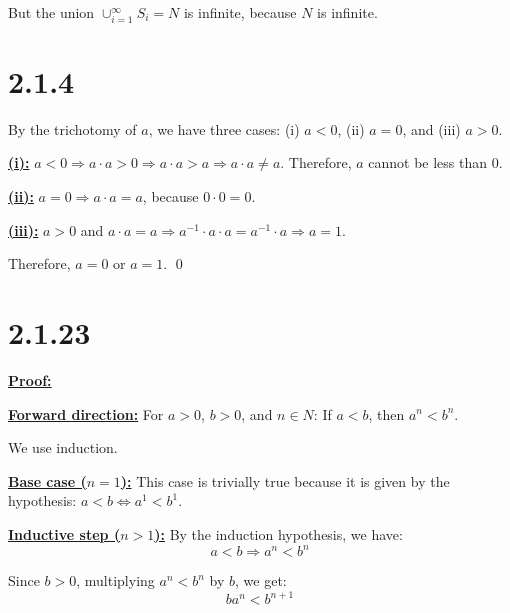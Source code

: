 \documentclass{article}
\begin{document}
\noindent
But the union $\cup_{i=1}^{\infty}S_i = N$ is infinite, because $N$ is infinite.
\newline

\section*{2.1.4}
By the trichotomy of $a$, we have three cases: (i) $a < 0$, (ii) $a = 0$, and (iii) $a > 0$.
\newline

\noindent
\textbf{\underline{(i):}} $a<0 \Rightarrow a \cdot a > 0 \Rightarrow a \cdot a > a \Rightarrow a \cdot a \not= a$. Therefore, $a$ cannot be less than 0.
\newline

\noindent
\textbf{\underline{(ii):}} $a=0 \Rightarrow a \cdot a = a$, because $0 \cdot 0 = 0$.
\newline

\noindent
\textbf{\underline{(iii):}} $a>0$ and $a \cdot a = a \Rightarrow a^{-1} \cdot a \cdot a = a^{-1} \cdot a \Rightarrow a = 1$.
\newline

\noindent
Therefore, $a=0$ or $a=1$.
\qed
\newline

\section*{2.1.23}
\textbf{\underline{Proof:}}
\newline

\noindent
\textbf{\underline{Forward direction:}} For $a>0$, $b>0$, and $n \in N$: If $a<b$, then $a^n<b^n$.
\newline

\noindent
We use induction.
\newline

\noindent
\textbf{\underline{Base case ($n=1$):}} This case is trivially true because it is given by the hypothesis: $a<b \iff a^1 < b^1$.
\newline

\noindent
\textbf{\underline{Inductive step ($n>1$):}} By the induction hypothesis, we have: 
\begin{equation*}
  a<b \Rightarrow a^n < b^n
\end{equation*}


\noindent
Since $b>0$, multiplying $a^n < b^n$ by $b$, we get:
\begin{equation}
  ba^n < b^{n+1} \label{2.1.23.1}
\end{equation}
\end{document}
